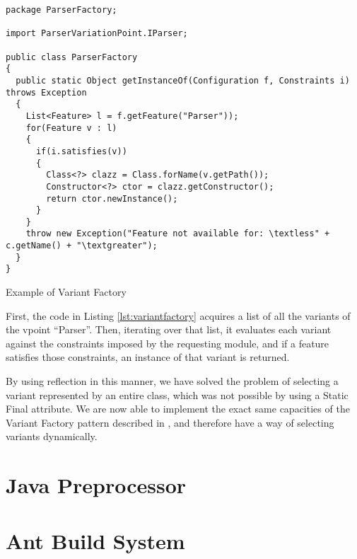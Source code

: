\begin{listing}
\begin{verbatim}
package ParserFactory;

import ParserVariationPoint.IParser;

public class ParserFactory
{
  public static Object getInstanceOf(Configuration f, Constraints i) throws Exception
  {
    List<Feature> l = f.getFeature("Parser"));
    for(Feature v : l)
    {
      if(i.satisfies(v))
      {
        Class<?> clazz = Class.forName(v.getPath());
        Constructor<?> ctor = clazz.getConstructor();
        return ctor.newInstance();
      }
    }
    throw new Exception("Feature not available for: \textless" + c.getName() + "\textgreater");
  }
}
\end{verbatim}
\caption{Example of Variant Factory} \label{lst:variantfactory}
\end{listing}

First, the code in Listing \ref{lst:variantfactory} acquires a list of all the \gls{variant}s of the \gls{vpoint} ``Parser''. Then, iterating over that list, it evaluates each \gls{variant} against the constraints imposed by the requesting module, and if a feature satisfies those constraints, an instance of that \gls{variant} is returned.

By using reflection in this manner, we have solved the problem of selecting a \gls{variant} represented by an entire class, which was not possible by using a Static Final attribute. We are now able to implement the exact same capacities of the Variant Factory pattern described in \cite{LASER:2015}, and therefore have a way of selecting \gls{variant}s dynamically.


\section{Java Preprocessor}
\label{sc:prepros}



\section{Ant Build System}
\label{sc:ant}

